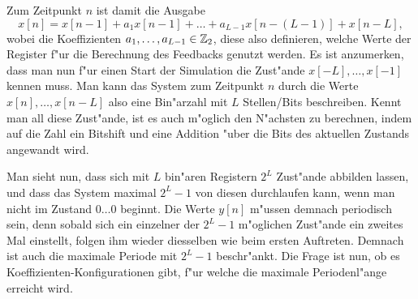 Zum Zeitpunkt $n$ ist damit die Ausgabe
\[
x[n] 
    = x[n-1] 
      + a_1 x[n-1] 
      + \ldots 
      + a_{L-1} x[n - (L-1)] 
      + x[n-L],
\]
wobei die Koeffizienten $a_1, \ldots, a_{L-1} \in \mathbb{Z}_2$, diese also definieren, welche Werte der Register f"ur die Berechnung des Feedbacks genutzt werden.
Es ist anzumerken, dass man nun f"ur einen Start der Simulation die Zust"ande $x[-L], \ldots, x[-1]$ kennen muss.
Man kann das System zum Zeitpunkt $n$ durch die Werte $x[n], \ldots, x[n-L]$ also eine Bin"arzahl mit $L$ Stellen/Bits beschreiben. 
Kennt man all diese Zust"ande, ist es auch m"oglich den N"achsten zu berechnen, indem auf die Zahl ein Bitshift und eine  Addition "uber die Bits des aktuellen Zustands angewandt wird.

Man sieht nun, dass sich mit $L$ bin"aren Registern $2^L$ Zust"ande abbilden lassen, und dass das System maximal $2^L-1$ von diesen durchlaufen kann, wenn man nicht im Zustand $0\ldots 0$ beginnt.
Die Werte $y[n]$ m"ussen demnach periodisch sein, denn sobald sich ein einzelner der $2^L-1$ m"oglichen Zust"ande ein zweites Mal einstellt, folgen ihm wieder diesselben wie beim ersten Auftreten.
Demnach ist auch die maximale Periode mit $2^L-1$ beschr"ankt.
Die Frage ist nun, ob es Koeffizienten-Konfigurationen gibt, f"ur welche die maximale Periodenl"ange erreicht wird.

